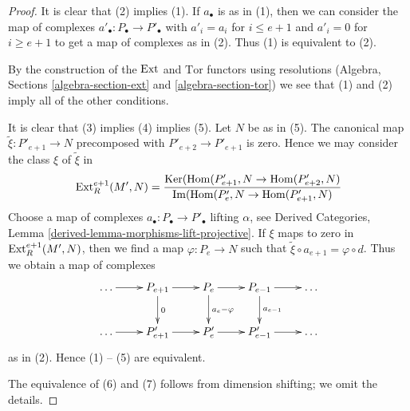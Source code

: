 \begin{proof}
It is clear that (2) implies (1). If $a_\bullet$ is as in (1), then
we can consider the map of complexes $a'_\bullet : P_\bullet \to P'_\bullet$
with $a'_i = a_i$ for $i \leq e + 1$ and $a'_i = 0$ for $i \geq e + 1$
to get a map of complexes as in (2). Thus (1) is equivalent to (2).

\medskip\noindent
By the construction of the $\mathop{\mathrm{Ext}}\nolimits$ and $\text{Tor}$ functors using
resolutions (Algebra, Sections \ref{algebra-section-ext}
and \ref{algebra-section-tor}) we see 
that (1) and (2) imply all of the other conditions.

\medskip\noindent
It is clear that (3) implies (4) implies (5). Let $N$ be as in (5).
The canonical map $\tilde \xi : P'_{e + 1} \to N$ precomposed with
$P'_{e + 2} \to P'_{e + 1}$ is zero. Hence we may consider the class
$\xi$ of $\tilde \xi$ in
$$
\mathop{\mathrm{Ext}}\nolimits^{e + 1}_R(M', N) =
\frac{\mathop{\mathrm{Ker}}(\mathop{\mathrm{Hom}}\nolimits(P'_{e + 1}, N \to \mathop{\mathrm{Hom}}\nolimits(P'_{e + 2}, N)}{
\mathop{\mathrm{Im}}(\mathop{\mathrm{Hom}}\nolimits(P'_e, N \to \mathop{\mathrm{Hom}}\nolimits(P'_{e + 1}, N)}
$$
Choose a map of complexes $a_\bullet : P_\bullet \to P'_\bullet$
lifting $\alpha$, see Derived Categories, Lemma
\ref{derived-lemma-morphisms-lift-projective}.
If $\xi$ maps to zero in $\mathop{\mathrm{Ext}}\nolimits^{e + 1}_R(M', N)$, then
we find a map $\varphi : P_e \to N$ such that
$\tilde \xi  \circ a_{e + 1} = \varphi \circ d$.
Thus we obtain a map of complexes
$$
\xymatrix{
\ldots \ar[r] &
P_{e + 1} \ar[r] \ar[d]^0 &
P_e \ar[r] \ar[d]^{a_e - \varphi} &
P_{e - 1} \ar[r] \ar[d]^{a_{e - 1}} &
\ldots \\
\ldots \ar[r] &
P'_{e + 1} \ar[r] &
P'_e \ar[r] &
P'_{e - 1} \ar[r] &
\ldots
}
$$
as in (2). Hence (1) -- (5) are equivalent.

\medskip\noindent
The equivalence of (6) and (7) follows from dimension shifting;
we omit the details.


\end{proof}
